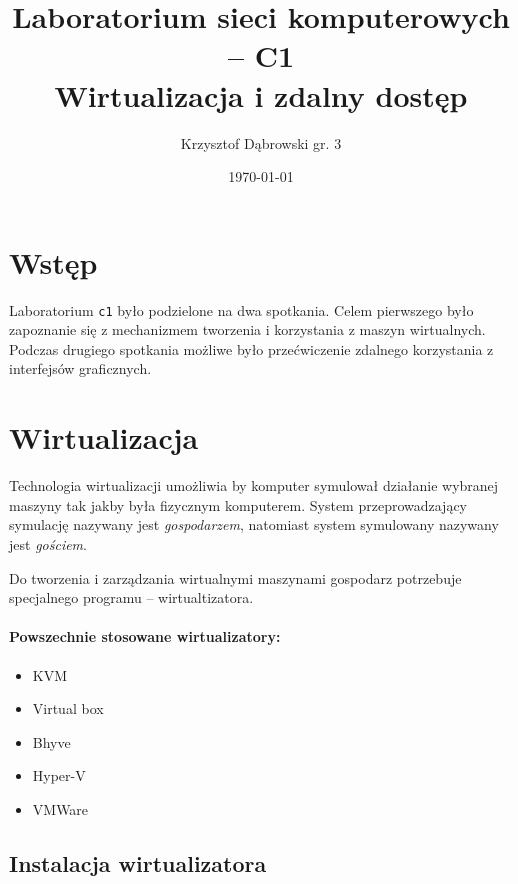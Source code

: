 \documentclass{article}
\title{Laboratorium sieci komputerowych -- C1 \\ Wirtualizacja i zdalny dostęp}
\author{Krzysztof Dąbrowski gr. 3}
\date{\today}
\begin{document}
\maketitle{}
\tableofcontents{}
\newpage

\section{Wstęp}
Laboratorium \texttt{c1} było podzielone na dwa spotkania. Celem pierwszego było zapoznanie się z mechanizmem tworzenia i korzystania z maszyn wirtualnych. Podczas drugiego spotkania możliwe było przećwiczenie zdalnego korzystania z interfejsów graficznych.

\section{Wirtualizacja}
Technologia wirtualizacji umożliwia by komputer symulował działanie wybranej maszyny tak jakby była fizycznym komputerem. System przeprowadzający symulację nazywany jest \textit{gospodarzem}, natomiast system symulowany nazywany jest \textit{gościem}.

Do tworzenia i zarządzania wirtualnymi maszynami gospodarz potrzebuje specjalnego programu -- wirtualtizatora.

\paragraph{Powszechnie stosowane wirtualizatory:}
\begin{itemize}
    \item KVM
    \item Virtual box
    \item Bhyve
    \item Hyper-V
    \item VMWare
\end{itemize}

\subsection{Instalacja wirtualizatora}
\end{document}
